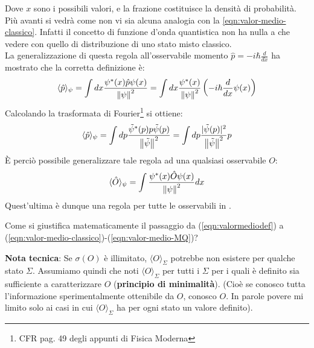 \documentclass[FisicaTeorica.tex]{subfiles}
\begin{document}
Dove $x$ sono i possibili valori, e la frazione costituisce la densità di probabilità. Più avanti si vedrà come non vi sia alcuna analogia con la \eqref{eqn:valor-medio-classico}. Infatti il concetto di funzione d'onda quantistica non ha nulla a che vedere con quello di distribuzione di uno stato misto classico. \\
La generalizzazione di questa regola all'osservabile momento $\hat{p}=-i\hbar \frac{d}{dx}$ ha mostrato che la corretta definizione è:
\[
\langle \hat{p} \rangle_\psi = \int dx \frac{\psi^*(x) \hat{p}\psi(x)}{\left\lVert\psi\right\rVert^2} = \int dx \frac{\psi^*(x)}{\left\lVert\psi\right\rVert^2} \left ( -i\hbar \frac{d}{dx}\psi(x) \right )
\]
Calcolando la trasformata di Fourier\footnote{CFR pag. 49 degli appunti di Fisica Moderna} si ottiene: %
\[
\langle \hat{p} \rangle_\psi = \int dp \frac{\tilde{\psi}^*(p)p\tilde{\psi}(p)}{\left\lVert\tilde{\psi}\right\rVert^2} = \int dp\frac{|\tilde{\psi}(p)|^2}{\left\lVert\tilde{\psi}\right\rVert^2}p
\]
È perciò possibile generalizzare tale regola ad una qualsiasi osservabile $O$:
\begin{equation}
\langle \hat{O}\rangle_\psi = \int \frac{\psi^*(x) \hat{O} \psi(x)}{\left\lVert\psi\right\rVert^2} dx
\label{eqn:valor-medio-MQ}
\end{equation}
Quest'ultima è dunque una regola per tutte le osservabili in \MQ.

\begin{question}
Come si giustifica matematicamente il passaggio da (\ref{eqn:valormediodef}) a (\ref{eqn:valor-medio-classico})-(\ref{eqn:valor-medio-MQ})?
\label{q:giustificazione-prob}
\end{question}
\textbf{Nota tecnica}: Se $\sigma(O)$ è illimitato, $\langle O \rangle_\Sigma$ potrebbe non esistere per qualche stato $\Sigma$. Assumiamo quindi che noti $\langle O \rangle_\Sigma$  per tutti i $\Sigma$ per i quali è definito sia sufficiente a caratterizzare $O$ (\textbf{principio di minimalità}). (Cioè se conosco tutta l'informazione sperimentalmente ottenibile da $O$, conosco $O$. In parole povere mi limito solo ai casi in cui $\langle O \rangle_\Sigma$ ha per ogni stato un valore definito).
\end{document}
